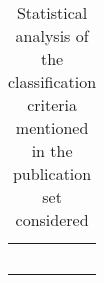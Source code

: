 \documentclass[10pt]{article}
\begin{document}
\begin{table}[ht]
\begin{tabular}{@{}p{1.0cm} p{4.0cm} p{2.0cm} p{2.0cm} m{2.5cm}  @{}}
        \multicolumn{1}{c|}{\multirow{7}{*}{}} & \multicolumn{1}{c|}{\multirow{7}{*}{}} & \multicolumn{1}{c|}{\multirow{7}{*}{}} & \multicolumn{1}{c|}{\multirow{7}{*}{}} & \\ %
        \multicolumn{1}{c|}{\multirow{7}{*}{}} & \multicolumn{1}{c|}{\multirow{7}{*}{}} & \multicolumn{1}{c|}{\multirow{7}{*}{}} & \multicolumn{1}{c|}{\multirow{7}{*}{}} & \\ %
        \multicolumn{1}{c|}{\multirow{7}{*}{}} & \multicolumn{1}{c|}{\multirow{7}{*}{}} & \multicolumn{1}{c|}{\multirow{7}{*}{}} & \multicolumn{1}{c|}{\multirow{7}{*}{}} & \\ %
        \multicolumn{1}{c|}{\multirow{7}{*}{}} & \multicolumn{1}{c|}{\multirow{7}{*}{}} & \multicolumn{1}{c|}{\multirow{7}{*}{}} & \multicolumn{1}{c|}{\multirow{7}{*}{}} & \\ %
        \multicolumn{1}{c|}{\multirow{7}{*}{}} & \multicolumn{1}{c|}{\multirow{7}{*}{}} & \multicolumn{1}{c|}{\multirow{7}{*}{}} & \multicolumn{1}{c|}{\multirow{7}{*}{}} & \\ %
        \hline
        \hline
    \end{tabular}
\caption{Statistical analysis of the classification criteria mentioned in the publication set considered}
\label{tab:e-voting-classification-criteria}
\end{table}
    
    
    
\end{document}
